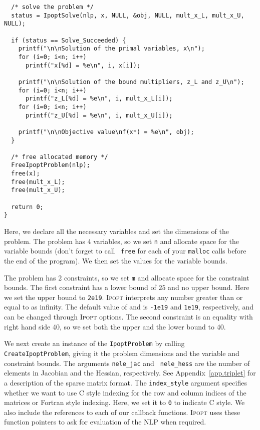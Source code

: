 \documentclass[10pt]{article}
\newcommand{\Ipopt}{\textsc{Ipopt}\xspace}
\begin{document}
\begin{verbatim}
  /* solve the problem */
  status = IpoptSolve(nlp, x, NULL, &obj, NULL, mult_x_L, mult_x_U, NULL);

  if (status == Solve_Succeeded) {
    printf("\n\nSolution of the primal variables, x\n");
    for (i=0; i<n; i++)
      printf("x[%d] = %e\n", i, x[i]); 

    printf("\n\nSolution of the bound multipliers, z_L and z_U\n");
    for (i=0; i<n; i++)
      printf("z_L[%d] = %e\n", i, mult_x_L[i]); 
    for (i=0; i<n; i++)
      printf("z_U[%d] = %e\n", i, mult_x_U[i]); 

    printf("\n\nObjective value\nf(x*) = %e\n", obj); 
  }
 
  /* free allocated memory */
  FreeIpoptProblem(nlp);
  free(x);
  free(mult_x_L);
  free(mult_x_U);

  return 0;
}
\end{verbatim}

Here, we declare all the necessary variables and set the dimensions of
the problem.  The problem has 4 variables, so we set {\tt n} and
allocate space for the variable bounds (don't forget to call {\tt
  free} for each of your {\tt malloc} calls before the end of the
program). We then set the values for the variable bounds.

The problem has 2 constraints, so we set {\tt m} and allocate space
for the constraint bounds. The first constraint has a lower bound of
$25$ and no upper bound.  Here we set the upper bound to
\texttt{2e19}. \Ipopt interprets any number greater than or equal to
 as infinity.
The default value of 
and  is
\texttt{-1e19} and \texttt{1e19}, respectively, and can be changed
through \Ipopt options.  The second constraint is an equality with
right hand side 40, so we set both the upper and the lower bound to
40.

We next create an instance of the {\tt IpoptProblem} by calling {\tt
CreateIpoptProblem}, giving it the problem dimensions and the variable
and constraint bounds. The arguments {\tt nele\_jac} and {\tt
nele\_hess} are the number of elements in Jacobian and the Hessian,
respectively. See Appendix~\ref{app.triplet} for a description of the
sparse matrix format. The {\tt index\_style} argument specifies whether
we want to use C style indexing for the row and column indices of the
matrices or Fortran style indexing. Here, we set it to {\tt 0} to
indicate C style.  We also include the references to each of our
callback functions. \Ipopt uses these function pointers to ask for
evaluation of the NLP when required.
\end{document}
